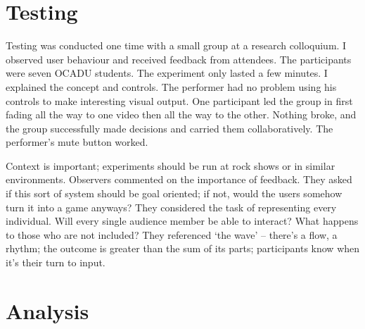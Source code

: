 \section{Testing}

Testing was conducted one time with a small group at a research colloquium. I observed user behaviour and received feedback from attendees. The participants were seven OCADU students. The experiment only lasted a few minutes. I explained the concept and controls. The performer had no problem using his controls to make interesting visual output. One participant led the group in first fading all the way to one video then all the way to the other. Nothing broke, and the group successfully made decisions and carried them collaboratively. The performer's mute button worked.

Context is important; experiments should be run at rock shows or in similar environments. Observers commented on the importance of feedback. They asked if this sort of system should be goal oriented; if not, would the users somehow turn it into a game anyways? They considered the task of representing every individual. Will every single audience member be able to interact? What happens to those who are not included? They referenced `the wave' -- there's a flow, a rhythm; the outcome is greater than the sum of its parts; participants know when it's their turn to input.


\section{Analysis}

